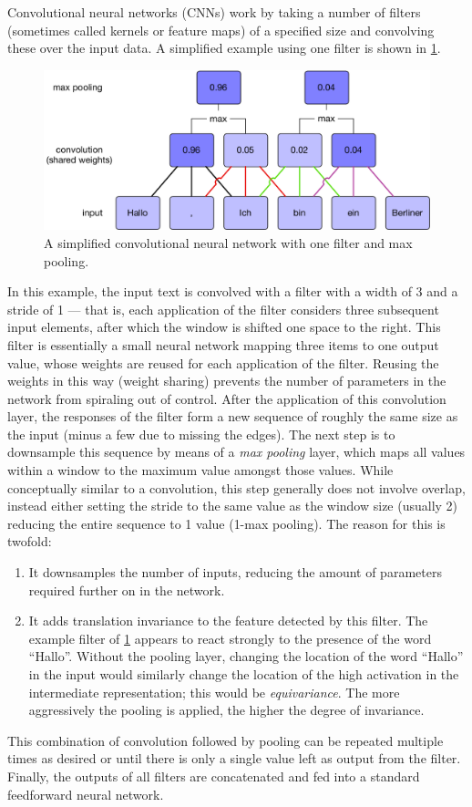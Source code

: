 Convolutional neural networks (CNNs) work by taking a number of filters
(sometimes called kernels or feature maps) of a specified size and convolving
these over the input data. A simplified example using one filter is shown in
\cref{fig:cnn}.
\begin{figure}[htb]
  \centering
  \includegraphics[width=\textwidth]{figures/cnn.pdf}
  \caption{A simplified convolutional neural network with one filter and
    max pooling.}%
  \label{fig:cnn}
\end{figure}
In this example, the input text is convolved with a filter with a width of 3 and
a stride of 1 --- that is, each application of the filter considers three
subsequent input elements, after which the window is shifted one space to the
right. This filter is essentially a small neural network mapping three items to
one output value, whose weights are reused for each application of the filter.
Reusing the weights in this way (weight sharing) prevents the number of
parameters in the network from spiraling out of control.
\citep{lecun1995convolutional} After the application of this convolution layer,
the responses of the filter form a new sequence of roughly the same size as the
input (minus a few due to missing the edges). The next step is to downsample
this sequence by means of a \emph{max pooling} layer, which maps all values
within a window to the maximum value amongst those values. While conceptually
similar to a convolution, this step generally does not involve overlap, instead
either setting the stride to the same value as the window size (usually 2)
reducing the entire sequence to 1 value (1-max pooling). The reason for this is
twofold:
\begin{enumerate}
\item It downsamples the number of inputs, reducing the amount of parameters
  required further on in the network.
\item It adds translation invariance to the feature detected by this filter. The
  example filter of \cref{fig:cnn} appears to react strongly to the
  presence of the word ``Hallo''. Without the pooling layer, changing the
  location of the word ``Hallo'' in the input would similarly change the
  location of the high activation in the intermediate representation; this would
  be \emph{equivariance}. The more aggressively the pooling is applied, the
  higher the degree of invariance.
\end{enumerate}
This combination of convolution followed by pooling can be repeated multiple
times as desired or until there is only a single value left as output from the
filter. Finally, the outputs of all filters are concatenated and fed into a
standard feedforward neural network.

